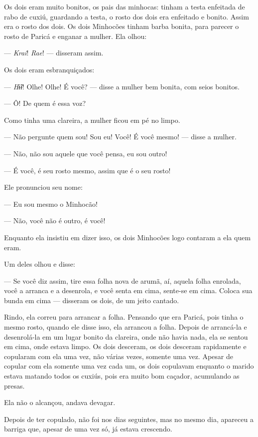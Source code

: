 Os dois eram muito bonitos, os pais das minhocas: tinham a testa
enfeitada de rabo de cuxiú, guardando a testa, o rosto dos dois era
enfeitado e bonito. Assim era o rosto dos dois. Os dois Minhocões tinham
barba bonita, para parecer o rosto de Paricá e enganar a mulher. Ela
olhou: 

--- \textit{Krai}! \textit{Rae}! --- disseram assim. 

Os dois eram esbranquiçados: 

--- \textit{Hɨ̃ɨ}! Olhe! Olhe! É você? --- disse a mulher bem bonita, com seios
bonitos.

--- Ô! De quem é essa voz?

Como tinha uma clareira, a mulher ficou em pé no limpo. 

--- Não pergunte quem sou! Sou eu! Você! É você mesmo! --- disse a
mulher.

--- Não, não sou aquele que você pensa, eu sou outro! 

--- É você, é seu rosto mesmo, assim que é o seu rosto! 

Ele pronunciou seu nome: 

--- Eu sou mesmo o Minhocão!

--- Não, você não é outro, é você! 

Enquanto ela insistiu em dizer isso, os dois Minhocões logo contaram a ela quem eram. 

Um deles olhou e disse: 

--- Se você diz assim, tire essa folha nova de arumã, aí, aquela folha
enrolada, você a arranca e a desenrola, e você senta em cima, sente-se
em cima. Coloca sua bunda em cima --- disseram os dois, de um jeito
cantado. 

Rindo, ela correu para arrancar a folha. Pensando que era Paricá, pois
tinha o mesmo rosto, quando ele disse isso, ela arrancou a folha. Depois
de arrancá-la e desenrolá-la em um lugar bonito da clareira, onde não
havia nada, ela se sentou em cima, onde estava limpo. Os dois desceram,
os dois desceram rapidamente e copularam com ela uma vez, não várias
vezes, somente uma vez. Apesar de copular com ela somente uma vez cada um, os dois copulavam enquanto o marido estava matando todos os cuxiús,
pois era muito bom caçador, acumulando as presas. 

Ela não o alcançou, andava devagar. 

Depois de ter copulado, não foi nos dias seguintes, mas no mesmo dia,
apareceu a barriga que, apesar de uma vez só, já estava crescendo. 

